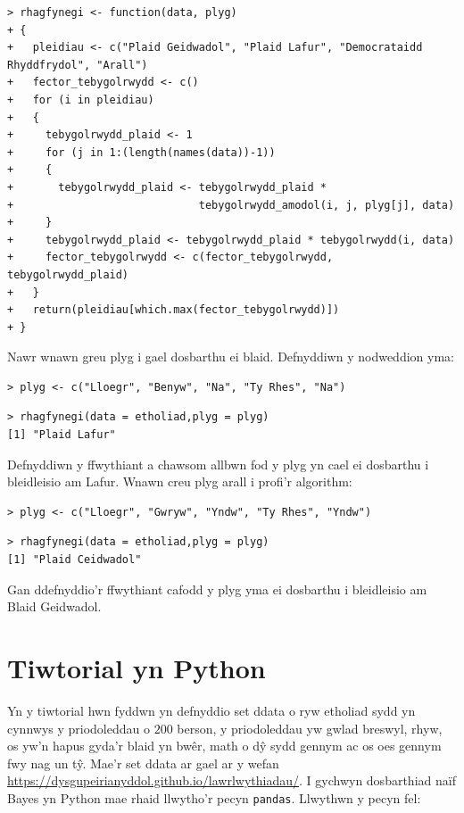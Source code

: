 \begin{verbatim}
> rhagfynegi <- function(data, plyg)
+ {
+   pleidiau <- c("Plaid Geidwadol", "Plaid Lafur", "Democrataidd Rhyddfrydol", "Arall")
+   fector_tebygolrwydd <- c()
+   for (i in pleidiau)
+   {
+     tebygolrwydd_plaid <- 1
+     for (j in 1:(length(names(data))-1))
+     {
+       tebygolrwydd_plaid <- tebygolrwydd_plaid * 
+                             tebygolrwydd_amodol(i, j, plyg[j], data)
+     }
+     tebygolrwydd_plaid <- tebygolrwydd_plaid * tebygolrwydd(i, data)
+     fector_tebygolrwydd <- c(fector_tebygolrwydd, tebygolrwydd_plaid)
+   }
+   return(pleidiau[which.max(fector_tebygolrwydd)])
+ }
\end{verbatim}

Nawr wnawn greu plyg i gael dosbarthu ei blaid. Defnyddiwn y nodweddion yma:

\begin{verbatim}
> plyg <- c("Lloegr", "Benyw", "Na", "Ty Rhes", "Na")
\end{verbatim}

\begin{verbatim}
> rhagfynegi(data = etholiad,plyg = plyg)
[1] "Plaid Lafur"
\end{verbatim}

Defnyddiwn y ffwythiant a chawsom allbwn fod y plyg yn cael ei dosbarthu i bleidleisio am Lafur. Wnawn creu plyg arall i profi'r algorithm:

\begin{verbatim}
> plyg <- c("Lloegr", "Gwryw", "Yndw", "Ty Rhes", "Yndw")
\end{verbatim}

\begin{verbatim}
> rhagfynegi(data = etholiad,plyg = plyg)
[1] "Plaid Ceidwadol"
\end{verbatim}

Gan ddefnyddio'r ffwythiant cafodd y plyg yma ei dosbarthu i bleidleisio am Blaid Geidwadol.

\section{Tiwtorial yn Python}

Yn y tiwtorial hwn fyddwn yn defnyddio set ddata o ryw etholiad sydd yn cynnwys y priodoleddau o $200$ berson, y priodoleddau yw gwlad breswyl, rhyw, os yw'n hapus gyda'r blaid yn bw\^{e}r, math o d\^{y} sydd gennym ac os oes gennym fwy nag un t\^{y}. Mae'r set ddata ar gael ar y wefan \url{https://dysgupeirianyddol.github.io/lawrlwythiadau/}. I gychwyn dosbarthiad na\"{i}f Bayes yn Python mae rhaid llwytho'r pecyn \texttt{pandas}. Llwythwn y pecyn fel:

